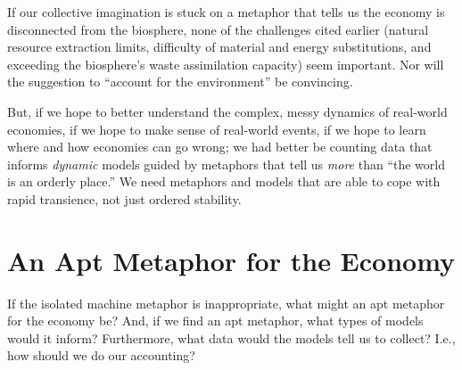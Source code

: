 If our collective imagination is stuck on a metaphor that tells us 
the economy is disconnected from the biosphere,
none of the challenges cited earlier (natural resource extraction limits,
difficulty of material and energy substitutions, and 
exceeding the biosphere's waste assimilation capacity)
seem important. 
Nor will the suggestion to ``account for the environment'' be convincing.

But, if we hope to better understand the complex, 
messy dynamics of real-world economies,
if we hope to make sense of real-world events, 
if we hope to learn where and how economies can go wrong;
we had better be counting data that informs \emph{dynamic} models
guided by metaphors that tell us \emph{more} than ``the world is an orderly place.''
We need metaphors and models that are
able to cope with rapid transience,
not just ordered stability.


\section{An Apt Metaphor for the Economy}
\label{sec:apt_metaphor}

If the isolated machine metaphor is inappropriate, 
what might an apt metaphor for the economy be?
And, if we find an apt metaphor, what types of models would it inform?
Furthermore, what data would the models tell us to collect?
I.e., how should we do our accounting?

